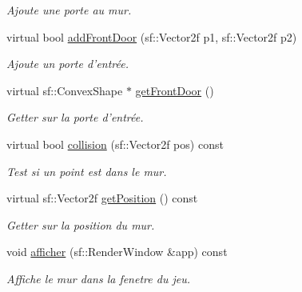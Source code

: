 \begin{DoxyCompactItemize}
\begin{DoxyCompactList}\small\item\em Ajoute une porte au mur. \end{DoxyCompactList}\item 
virtual bool \hyperlink{classMurAbstrait_a0eb0378500a78657e42366e2455ed8e0}{add\-Front\-Door} (sf\-::\-Vector2f p1, sf\-::\-Vector2f p2)
\begin{DoxyCompactList}\small\item\em Ajoute un porte d'entrée. \end{DoxyCompactList}\item 
virtual sf\-::\-Convex\-Shape $\ast$ \hyperlink{classMurAbstrait_a3fa81603bcf3efed9f32b18e7f2ee997}{get\-Front\-Door} ()
\begin{DoxyCompactList}\small\item\em Getter sur la porte d'entrée. \end{DoxyCompactList}\item 
virtual bool \hyperlink{classMurAbstrait_a9702e688a437bbe46635ec25c18353bc}{collision} (sf\-::\-Vector2f pos) const 
\begin{DoxyCompactList}\small\item\em Test si un point est dans le mur. \end{DoxyCompactList}\item 
virtual sf\-::\-Vector2f \hyperlink{classMurAbstrait_a20de772291f223c6886ee58a184672b1}{get\-Position} () const 
\begin{DoxyCompactList}\small\item\em Getter sur la position du mur. \end{DoxyCompactList}\item 
void \hyperlink{classMurAbstrait_a29893152ff8009d9072efbac41f5a7dd}{afficher} (sf\-::\-Render\-Window \&app) const 
\begin{DoxyCompactList}\small\item\em Affiche le mur dans la fenetre du jeu. \end{DoxyCompactList}\end{DoxyCompactItemize}

